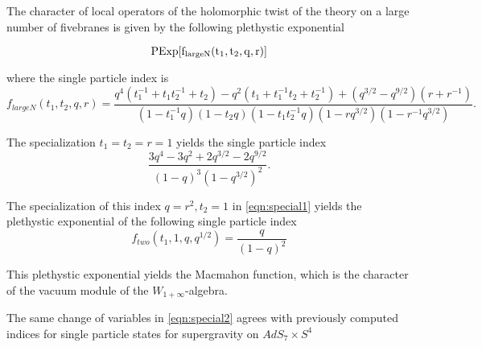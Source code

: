 \parsec


\begin{prop}
  The character of local operators of the holomorphic twist of the theory on a large number of fivebranes is given by the following plethystic exponential

  \[ \rm PExp [f_{large N}(t_{1}, t_{2}, q, r)] \]

  where the single particle index is \[f_{large N}(t_{1}, t_{2}, q, r) = \frac{q^4(t_1^{-1}+t_1t_2^{-1}+t_2)-q^2(t_1+t_1^{-1}t_2+t_2^{-1})+(q^{3/2}-q^{9/2})(r+r^{-1})}{(1-t_{1}^{-1}q)(1-t_{2}q)(1-t_{1}t_{2}^{-1}q)(1-rq^{3/2})(1-r^{-1}q^{3/2})}.\]
\end{prop}

\parsec

The specialization $t_1=t_2=r=1$ yields the single particle index
\[
\frac{3 q^4 - 3 q^2 + 2 q^{3/2} - 2 q^{9/2}}{(1-q)^3 (1-q^{3/2})^2} .
\]

\parsec 
The specialization of this index $q=r^2, t_2=1$ in \eqref{eqn:special1} yields the plethystic exponential of the following single particle index
\[
f_{two}(t_1, 1, q, q^{1/2}) = \frac{q}{(1-q)^2}
\]

This plethystic exponential yields the Macmahon function, which is the character of the vacuum module of the $W_{1+\infty}$-algebra.

\parsec The same change of variables in \eqref{eqn:special2} agrees with previously computed indices for single particle states for supergravity on $AdS_{7}\times S^{4}$ 

%
